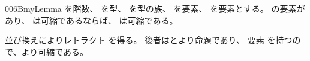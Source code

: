 \documentclass[index]{subfiles}
\begin{document}
\begin{myBlock}{006B}{myLemma}
  を階数、
  を型、
  を型の族、
  を要素、
  を要素とする。
  の要素があり、
  は可縮であるならば、
  は可縮である。
\end{myBlock}
\begin{myProof}
  並び換えによりレトラクト
  を得る。
  後者はとより命題であり、
  要素
  を持つので、より可縮である。
\end{myProof}
\end{document}
